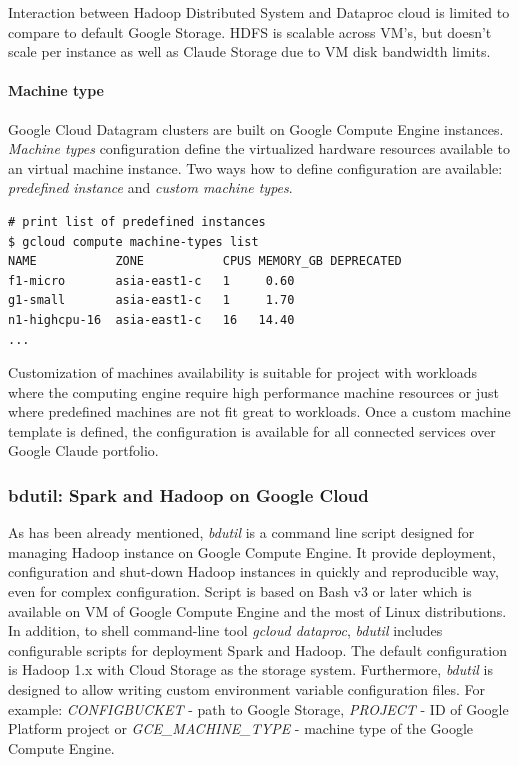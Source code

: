 \documentclass[a4paper,12pt,oneside]{report}
\begin{document}
	Interaction between Hadoop Distributed System and Dataproc cloud is limited to
	compare to default Google Storage. HDFS is scalable across VM’s, but doesn’t scale per instance as
	 well as Claude Storage due to VM disk bandwidth limits. 
	
	\paragraph{Machine type} Google Cloud Datagram clusters are built on Google
	Compute Engine instances. \textit{Machine types} configuration define the virtualized hardware
	 resources	available to an  virtual machine instance. Two ways how to define configuration are 
	 available: \textit{predefined instance} and \textit{custom machine types}.  
	
	\begin{footnotesize}
		\begin{lstlisting}[style=mybash]
# print list of predefined instances
$ gcloud compute machine-types list
NAME           ZONE           CPUS MEMORY_GB DEPRECATED
f1-micro       asia-east1-c   1     0.60
g1-small       asia-east1-c   1     1.70
n1-highcpu-16  asia-east1-c   16   14.40
...
		\end{lstlisting}
	\end{footnotesize}
	
	Customization of machines availability is suitable for project with workloads
	where the computing	engine require high performance machine resources or just where predefined
	machines are not fit great to workloads. Once a custom machine template is 
	defined, the configuration is available for all connected services over Google
	Claude portfolio.
	
	\subsubsection{bdutil: Spark and Hadoop on Google Cloud}\label{subsub:bdutil}
	As has been already mentioned, \textit{bdutil} is a command line script designed
	for	managing Hadoop instance on Google Compute Engine. It provide deployment,
	configuration	and shut-down Hadoop instances in quickly and reproducible way, even for complex
	configuration. 	Script is based on Bash v3 or later which is available on VM of Google Compute
	Engine  and the most of Linux distributions. In addition, to shell command-line tool
	\textit{gcloud dataproc}, \textit{bdutil} includes configurable scripts
	for deployment 	Spark and Hadoop. The default configuration is Hadoop 1.x with Cloud Storage as
	the storage system. Furthermore, \textit{bdutil} is designed to allow writing custom environment
	variable configuration 	files. For example: \emph{CONFIGBUCKET} - path to Google Storage, \emph{PROJECT}	
	- ID of Google Platform project or \emph{GCE\_MACHINE\_TYPE} - machine type of the Google Compute Engine.
	
\end{document}
